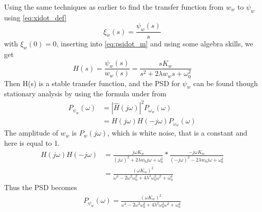 Using the same techniques as earlier to find the transfer function from $w_w$ to $\psi_w$ using \cref{eq:xidot_def} 
\begin{equation*}
    \xi_w(s) = \frac{\psi_w(s)}{s}
\end{equation*}
with $\xi_w(0) = 0$, inserting into \cref{eq:psidot_m} and using some algebra skills, we get
\begin{equation} 
    H(s) =  \frac{\psi_{w}(s)}{w_{w}(s)} = \frac{s K_w}{s^2 + 2\lambda w_w s + \omega_0^2}
\end{equation}
Then H(s) is a stable transfer function, and the PSD for $\psi_w$ can be found though stationary analysis by using the formula under from \cite{brown12}
\begin{equation}
\begin{split}
    P_{\psi_w}(\omega) &= |\hat{H}(j\omega)|^2 P_{\omega_w}(\omega)\\ 
    &= H(j\omega)H(-j\omega) P_{\omega_w}({\omega})
\end{split}
\end{equation}
The amplitude of $w_w$ is $P_w(j\omega)$, which is white noise, that is a constant and here is equal to 1. 
\begin{equation}
\begin{split}
    H(j\omega)H(-j\omega) &= \frac{j\omega K_w}{(j\omega)^2 + 2\lambda w_0 j\omega + \omega_0^2}*\frac{-j \omega K_w}{(-j\omega)^2 - 2\lambda w_0 j\omega + \omega_0^2} \\
    &= \frac{(\omega K_w)^2}{\omega^4 - 2\omega^2 \omega_0^2 + 4 \lambda^2 \omega_0^2 \omega^2 + \omega_0^4}
\end{split}
\end{equation} 
Thus the PSD becomes 
\begin{equation}
\begin{split}
   P_{\psi_w}(\omega)= \frac{(\omega K_w)^2}{\omega^4 - 2\omega^2 \omega_0^2 + 4 \lambda^2 \omega_0^2 \omega^2 + \omega_0^4}
\end{split}
\end{equation} 


